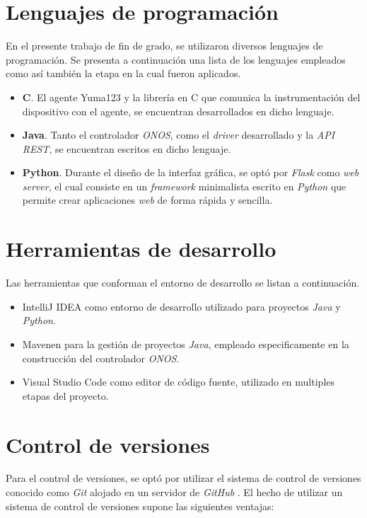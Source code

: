 \section{Lenguajes de programación}
En el presente trabajo de fin de grado, se utilizaron diversos lenguajes de programación. Se presenta a continuación una lista de los lenguajes empleados como así también la etapa en la cual fueron aplicados. 

\begin{itemize}
	\item \textbf{C}. El agente Yuma123 y la librería en C que comunica la instrumentación del dispositivo con el agente, se encuentran desarrollados en dicho lenguaje.  
	\item \textbf{Java}. Tanto el controlador \textit{ONOS}, como el \textit{driver} desarrollado y la \textit{API REST}, se encuentran escritos en dicho lenguaje. 
	\item \textbf{Python}. Durante el diseño de la interfaz gráfica, se optó por \textit{Flask} como \textit{web server}, el cual consiste en un \textit{framework} minimalista escrito en \textit{Python} que permite crear aplicaciones \textit{web} de forma rápida y sencilla. 
\end{itemize}

\section{Herramientas de desarrollo}
Las herramientas que conforman el entorno de desarrollo se listan a continuación.

\begin{itemize}
	\item IntelliJ IDEA como entorno de desarrollo utilizado para proyectos \textit{Java} y \textit{Python}.  
	\item Mavenen para la gestión de proyectos \textit{Java}, empleado especificamente en la construcción del controlador \textit{ONOS}.
	\item Visual Studio Code como editor de código fuente, utilizado en multiples etapas del proyecto.
\end{itemize}

\section{Control de versiones}
Para el control de versiones, se optó por utilizar el sistema de control de versiones conocido como \textit{Git} \parencite{gitref} alojado en un servidor de \textit{GitHub} \parencite{githubref}. El hecho de utilizar un sistema de control de versiones supone las siguientes ventajas:


